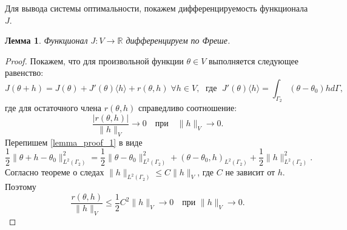 \documentclass[10pt]{article}
\newtheorem{lem}{\indent Лемма}
\begin{document}
    Для вывода системы оптимальности, покажем дифференцируемость функционала $J$.
    \begin{lem}
        \label{freshet_diff}
        Функционал $J : V \rightarrow \mathbb{R}$ дифференцируем по Фреше.
    \end{lem}
    \begin{proof}
        Покажем, что для произвольной функции $\theta \in V$ выполняется следующее равенство:
        \begin{equation}
            \label{lemma_proof_1}
            J(\theta + h) = J(\theta) + J'(\theta)\langle h \rangle + r(\theta, h) \;
            \forall h \in V, \; \text{ где } \;
            J'(\theta)\langle h \rangle = \int_{\Gamma_2} (\theta - \theta_0)h d\Gamma,
        \end{equation}
        где для остаточного члена $r(\theta,h)$ справедливо соотношение:
        \begin{equation}
            \label{lemma_proof_2}
            \frac{|r(\theta,h)|}{\|h\|_V} \rightarrow 0 \quad \text{при}
            \quad \|h\|_V \rightarrow 0.
        \end{equation}
        Перепишем \eqref{lemma_proof_1} в виде
        \[
            \frac{1}{2} \|\theta + h - \theta_0\|^2_{L^2(\Gamma_2)} =
            \frac{1}{2} \| \theta - \theta_0 \|^2_{L^2(\Gamma_2)} +
            (\theta - \theta_0, h)_{L^2(\Gamma_2)} +
            \frac{1}{2}\| h \|^2_{L^2(\Gamma_2)}.
        \]
        Согласно теореме о следах $ \|h\|_{L^2(\Gamma_2)} \le C \|h\|_V $,
        где $C$ не зависит от $h$.
        Поэтому
        \[
            \frac{r(\theta,h)}{\| h \|_V} \leq
            \frac{1}{2} C^2 \| h \|_V \rightarrow 0 \quad \text{при } \| h \|_V \rightarrow 0.
        \]
    \end{proof}
\end{document}

